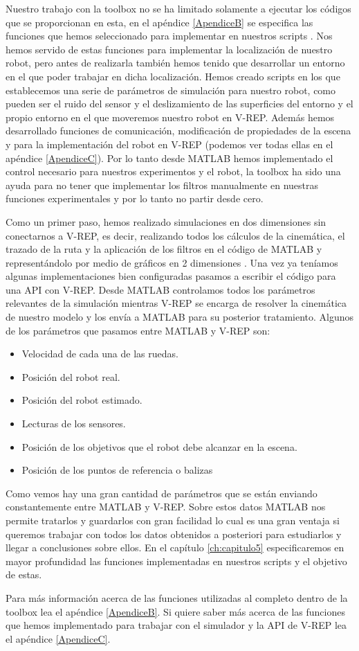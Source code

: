 %
Nuestro trabajo con la toolbox  no se ha limitado solamente a ejecutar los códigos que se proporcionan en esta, en el apéndice \ref{ApendiceB} se especifica las funciones que hemos seleccionado para implementar en nuestros scripts .
Nos hemos servido de estas funciones para implementar la localización de nuestro robot, pero antes de realizarla también hemos tenido que desarrollar un entorno en el que poder trabajar en dicha localización.
Hemos creado scripts en los que establecemos una serie de parámetros de simulación para nuestro robot, como pueden ser el ruido del sensor y el deslizamiento de las superficies del entorno y el propio entorno en el que moveremos nuestro robot en V-REP.
Además hemos desarrollado funciones de comunicación, modificación de propiedades de la escena y para la implementación del robot en V-REP (podemos ver todas ellas en el apéndice \ref{ApendiceC}).
Por lo tanto desde MATLAB hemos implementado el control necesario para nuestros experimentos y el robot, la toolbox \cite{toolbox_simo} ha sido una ayuda para no tener que implementar los filtros manualmente en nuestras funciones experimentales y por lo tanto no partir desde cero.

Como un primer paso, hemos realizado simulaciones en dos dimensiones sin conectarnos a V-REP, es decir, realizando todos los cálculos de la cinemática, el trazado de la ruta y la aplicación de los filtros en el código de MATLAB y representándolo por medio de gráficos en 2 dimensiones .
Una vez ya teníamos algunas implementaciones bien configuradas pasamos a escribir el código para una API con V-REP.
Desde MATLAB controlamos todos los parámetros relevantes de la simulación mientras V-REP se encarga de resolver la cinemática de nuestro modelo y los envía a MATLAB para su posterior tratamiento.
Algunos de los parámetros que pasamos entre MATLAB y V-REP son:
\begin{itemize}
\item Velocidad de cada una de las ruedas.
\item Posición del robot real.
\item Posición del robot estimado.
\item Lecturas de los sensores.
\item Posición de los objetivos que el robot debe alcanzar en la escena.
\item Posición de los puntos de referencia o balizas
\end{itemize}
Como vemos hay una gran cantidad de parámetros que se están enviando constantemente entre MATLAB y V-REP.
Sobre estos datos MATLAB nos permite tratarlos y guardarlos con gran facilidad lo cual es una gran ventaja si queremos trabajar con todos los datos obtenidos a posteriori para estudiarlos y llegar a conclusiones sobre ellos.
En el capítulo \ref{ch:capitulo5} especificaremos en mayor profundidad las funciones implementadas en nuestros scripts y el objetivo de estas.

Para más información acerca de las funciones utilizadas al completo dentro de la toolbox lea el apéndice \ref{ApendiceB}.
Si quiere saber más acerca de las funciones que hemos implementado para trabajar con el simulador y la API de V-REP lea el apéndice \ref{ApendiceC}.



